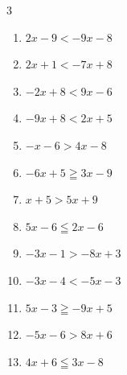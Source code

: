\begin{multicols}{3}
\begin{enumerate}

\columnbreak %

\resetques

  \item $2x-9<-9x-8$


  \item $2x+1<-7x+8$


  \item $-2x+8<9x-6$


  \item $-9x+8<2x+5$


  \item $-x-6>4x-8$


  \item $-6x+5\geqq 3x-9$


  \item $x+5>5x+9$

        \phantom{$\displaystyle x<-1$}

  \item $5x-6\leqq 2x-6$

        \phantom{$\displaystyle x\leqq 0$}

  \item $-3x-1>-8x+3$


  \item $-3x-4<-5x-3$


  \item $5x-3\geqq -9x+5$


  \item $-5x-6>8x+6$


  \item $4x+6\leqq 3x-8$


\end{enumerate}
\end{multicols}
